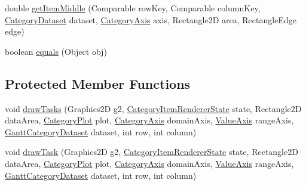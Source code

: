 \begin{DoxyCompactItemize}
\item 
double \mbox{\hyperlink{classorg_1_1jfree_1_1chart_1_1renderer_1_1category_1_1_gantt_renderer_a0f2caf6d4545eb08a9c3ca1df44d02c4}{get\+Item\+Middle}} (Comparable row\+Key, Comparable column\+Key, \mbox{\hyperlink{interfaceorg_1_1jfree_1_1data_1_1category_1_1_category_dataset}{Category\+Dataset}} dataset, \mbox{\hyperlink{classorg_1_1jfree_1_1chart_1_1axis_1_1_category_axis}{Category\+Axis}} axis, Rectangle2D area, Rectangle\+Edge edge)
\item 
boolean \mbox{\hyperlink{classorg_1_1jfree_1_1chart_1_1renderer_1_1category_1_1_gantt_renderer_a50c9693ace7197909f23350c532df69a}{equals}} (Object obj)
\end{DoxyCompactItemize}
\subsection*{Protected Member Functions}
\begin{DoxyCompactItemize}
\item 
void \mbox{\hyperlink{classorg_1_1jfree_1_1chart_1_1renderer_1_1category_1_1_gantt_renderer_a1b16aa859ec29dadaa17b96f05924800}{draw\+Tasks}} (Graphics2D g2, \mbox{\hyperlink{classorg_1_1jfree_1_1chart_1_1renderer_1_1category_1_1_category_item_renderer_state}{Category\+Item\+Renderer\+State}} state, Rectangle2D data\+Area, \mbox{\hyperlink{classorg_1_1jfree_1_1chart_1_1plot_1_1_category_plot}{Category\+Plot}} plot, \mbox{\hyperlink{classorg_1_1jfree_1_1chart_1_1axis_1_1_category_axis}{Category\+Axis}} domain\+Axis, \mbox{\hyperlink{classorg_1_1jfree_1_1chart_1_1axis_1_1_value_axis}{Value\+Axis}} range\+Axis, \mbox{\hyperlink{interfaceorg_1_1jfree_1_1data_1_1gantt_1_1_gantt_category_dataset}{Gantt\+Category\+Dataset}} dataset, int row, int column)
\item 
void \mbox{\hyperlink{classorg_1_1jfree_1_1chart_1_1renderer_1_1category_1_1_gantt_renderer_a062d75694f2433a19441441b8dcec3ea}{draw\+Task}} (Graphics2D g2, \mbox{\hyperlink{classorg_1_1jfree_1_1chart_1_1renderer_1_1category_1_1_category_item_renderer_state}{Category\+Item\+Renderer\+State}} state, Rectangle2D data\+Area, \mbox{\hyperlink{classorg_1_1jfree_1_1chart_1_1plot_1_1_category_plot}{Category\+Plot}} plot, \mbox{\hyperlink{classorg_1_1jfree_1_1chart_1_1axis_1_1_category_axis}{Category\+Axis}} domain\+Axis, \mbox{\hyperlink{classorg_1_1jfree_1_1chart_1_1axis_1_1_value_axis}{Value\+Axis}} range\+Axis, \mbox{\hyperlink{interfaceorg_1_1jfree_1_1data_1_1gantt_1_1_gantt_category_dataset}{Gantt\+Category\+Dataset}} dataset, int row, int column)
\end{DoxyCompactItemize}
